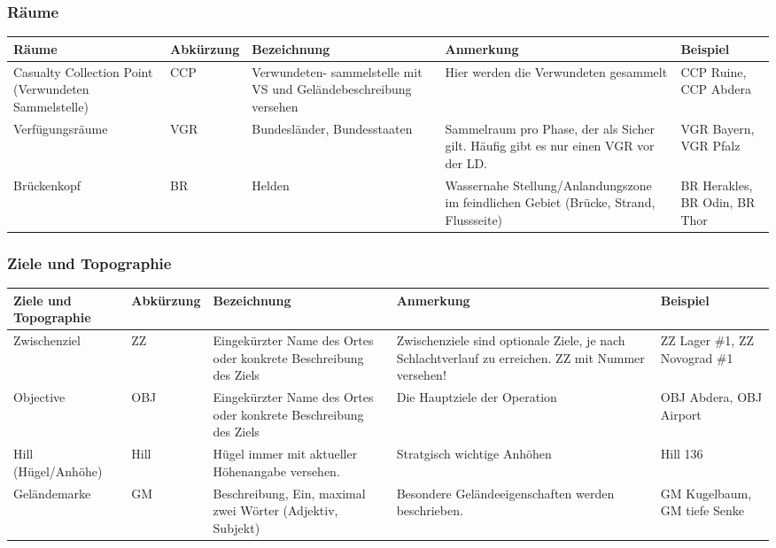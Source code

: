 \subsubsection{Räume}
\begin{longtable}{|p{3cm}|p{}|p{}|p{4cm}|p{}|} 																											\hline
	Räume			&		Abkürzung			&		Bezeichnung				&			Anmerkung 									&		Beispiel 			\\ \hline
	Casualty Collection Point (Verwundeten Sammelstelle) & CCP	& 		Verwundeten- sammelstelle mit VS und Geländebeschreibung versehen & Hier werden die Verwundeten gesammelt		& 		CCP Ruine, CCP Abdera	\\ \hline
	Verfügungsräume		&		VGR				&		Bundesländer, Bundesstaaten	&			Sammelraum pro Phase, der als Sicher gilt. Häufig gibt es nur einen VGR vor der LD. 	&	VGR Bayern, VGR Pfalz \\ \hline
	Brückenkopf			&		BR				&		Helden				&			Wassernahe Stellung/Anlandungszone  im feindlichen Gebiet (Brücke, Strand, Flussseite)	& BR Herakles, BR Odin, BR Thor \\ \hline
\end{longtable}

\subsubsection{Ziele und Topographie}
\begin{longtable}{|p{3cm}|p{}|p{}|p{4cm}|p{}|} 																											\hline
	Ziele und Topographie	&		Abkürzung			&		Bezeichnung				&			Anmerkung 									&		Beispiel 			\\ \hline
	Zwischenziel			&		ZZ				&		Eingekürzter Name des Ortes oder konkrete Beschreibung des Ziels	&	Zwischenziele sind optionale Ziele, je nach Schlachtverlauf zu erreichen. ZZ mit Nummer versehen!	& ZZ Lager \#1, ZZ Novograd \#1 \\ \hline
	Objective			&		OBJ				&		Eingekürzter Name des Ortes oder konkrete Beschreibung des Ziels	&	Die Hauptziele der Operation		&		OBJ Abdera, OBJ Airport	\\ \hline
	Hill (Hügel/Anhöhe)		&		Hill				&		Hügel immer mit aktueller Höhenangabe versehen.	&	Stratgisch wichtige Anhöhen					&		Hill 136			\\ \hline
	Geländemarke		&		GM				&		Beschreibung, Ein, maximal zwei Wörter (Adjektiv, Subjekt)	&	Besondere Geländeeigenschaften werden beschrieben.	& 	GM Kugelbaum, GM tiefe Senke \\ \hline
\end{longtable}

